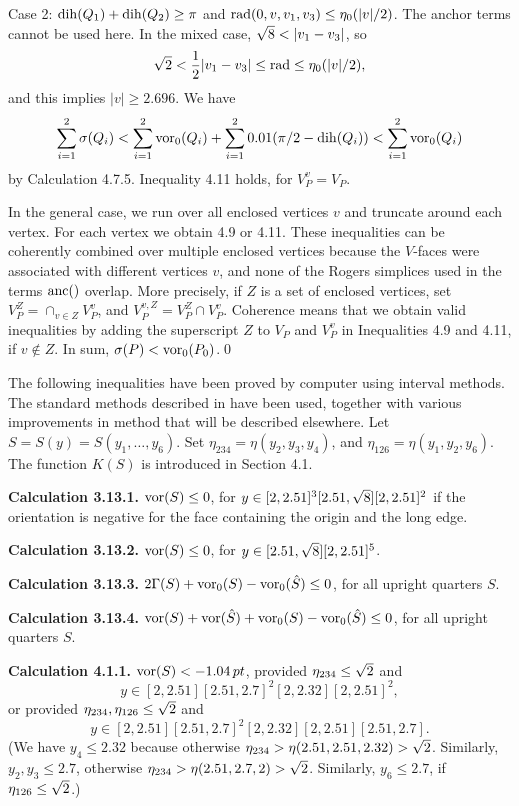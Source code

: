 \noindent
Case 2:  $\operatorname{dih}(Q_1)+\operatorname{dih}(Q_2)\ge\pi$ and 
	$\operatorname{rad}(0,v,v_1,v_3)\le \eta_0(|v|/2)$.
The anchor terms cannot be used here.
In the mixed case, $\sqr8<|v_1-v_3|$, so
$$\sqrt2<{1\over2}|v_1-v_3|\le\operatorname{rad} \le \eta_0(|v|/2),$$
and this implies $|v|\ge 2.696$.
We have $$\sum_{i=1}^2 \sigma(Q_i) <
\sum_{i=1}^2 \operatorname{vor}_0(Q_i) + \sum_{i=1}^2 0.01(\pi/2-\operatorname{dih}(Q_i))< \sum_{i=1}^2
\operatorname{vor}_0(Q_i)$$
by Calculation 4.7.5.  
Inequality 4.11 holds, for $V_P^v=V_P$.

In the general case, we run over all enclosed vertices $v$
and truncate around each vertex.  For each vertex we obtain
4.9 or 4.11.   These inequalities can be coherently combined
over multiple enclosed vertices because the $V$-faces were associated
with different vertices $v$, 
and none of the Rogers simplices used in the terms $\operatorname{anc}()$ overlap.
More precisely, if $Z$ is a set of enclosed vertices, set
$V_P^Z = \cap_{v\in Z} V_P^v$, and $V_P^{v,Z} = V_P^Z\cap V_P^v$.
Coherence means that we obtain valid inequalities by adding the superscript
$Z$ to $V_P$ and $V_P^v$ in Inequalities 4.9 and 4.11, if $v\not\in Z$.
In sum,  $\sigma(P) <\operatorname{vor}_0(P_0)$.\qed\enddemo





\bigskip
{}\endhead

The following inequalities have been proved by computer using
interval methods.  The standard methods described in \cite{I} have
been used, together with various improvements in method that will
be described elsewhere. 
  Let $S=S(y)=S(y_1,\ldots,y_6)$.  
Set $\eta_{234}=\eta(y_2,y_3,y_4)$,
and $\eta_{126} = \eta(y_1,y_2,y_6)$.
The function $K(S)$ is introduced in
Section 4.1.  
\parindent=0pt\hbox{}

\smallskip

{\bf Calculation 3.13.1.}  
$\operatorname{vor}(S)\le 0$, for $y\in[2,2.51]^3[2.51,\sqrt8][2,2.51]^2$
if the orientation is negative for the 
face containing the origin and the long edge.

{\bf Calculation 3.13.2.}
$\operatorname{vor}(S)\le 0$, for $y\in[2.51,\sqrt8][2,2.51]^5$.

{\bf Calculation 3.13.3.}
$2\Gamma(S) + \operatorname{vor}_0(S)-\operatorname{vor}_0(\hat S) \le0$,
	for all upright quarters $S$.

{\bf Calculation 3.13.4.}
$\operatorname{vor}(S) + \operatorname{vor}(\hat S)+ \operatorname{vor}_0(S)-\operatorname{vor}_0(\hat S) \le0$,
	for all upright quarters $S$.



{\bf Calculation 4.1.1.}
$\operatorname{vor}(S) < -1.04\,pt$, 
	provided $\eta_{234}\le\sqrt2$
	and $$y\in[2,2.51][2.51,2.7]^2[2,2.32][2,2.51]^2,$$
	or provided $\eta_{234},\eta_{126}\le\sqrt2$
	and $$y\in[2,2.51][2.51,2.7]^2[2,2.32][2,2.51][2.51,2.7].$$
(We have $y_4\le 2.32$ because otherwise 
$\eta_{234}>\eta(2.51,2.51,2.32)>\sqrt2$.  Similarly, $y_2,y_3\le 2.7$,
otherwise $\eta_{234}>\eta(2.51,2.7,2)>\sqrt2$. Similarly, $y_6\le 2.7$,
if $\eta_{126}\le\sqrt2$.)

